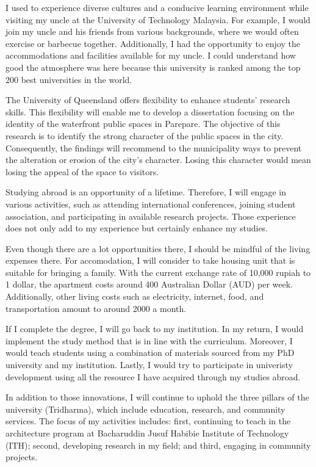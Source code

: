 \documentclass[../main.tex]{subfiles}
\begin{document}
I used to experience diverse cultures and a conducive learning environment while visiting my uncle at the University of Technology Malaysia. For example, I would join my uncle and his friends from various backgrounds, where we would often exercise or barbecue together. Additionally, I had the opportunity to enjoy the accommodations and facilities available for my uncle. I could understand how good the atmosphere was here because this university is ranked among the top 200 best universities in the world.

The University of Queensland offers flexibility to enhance students' research skills. This flexibility will enable me to develop a dissertation focusing on the identity of the waterfront public spaces in Parepare. The objective of this research is to identify the strong character of the public spaces in the city. Consequently, the findings will recommend to the municipality ways to prevent the alteration or erosion of the city's character. Losing this character would mean losing the appeal of the space to visitors.

Studying abroad is an opportunity of a lifetime. Therefore, I will engage in various activities, such as attending international conferences, joining student association, and participating in available research projects.
Those experience does not only add to my experience but certainly enhance my studies.

Even though there are a lot opportunities there, I should be mindful of the living expenses there.
For accomodation, I will consider to take housing unit that  is suitable for bringing a family.
With the current exchange rate of 10,000 rupiah to 1 dollar, the apartment costs around 400 Australian Dollar (AUD) per week.
Additionally, other living costs such as electricity, internet, food, and transportation amount to around 2000 a month.

If I complete the degree, I will go back to my institution.
In my return, I would implement the study method that is in line with the curriculum.
Moreover, I would teach students using a combination of materials sourced from my PhD university and my institution.
Lastly, I would try to participate in univeristy development using all the resource I have acquired through my studies abroad.

In addition to those innovations, I will continue to uphold the three pillars of the university (Tridharma), which include education, research, and community services. The focus of my activities includes: first, continuing to teach in the architecture program at Bacharuddin Jusuf Habibie Institute of Technology (ITH); second, developing research in my field; and third, engaging in community projects.
\end{document}
